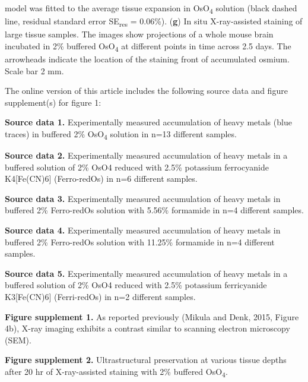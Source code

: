 \documentclass{article}
\begin{document}
model was fitted to the average tissue expansion in OsO\textsubscript{4} solution (black dashed line, residual standard error SE\textsubscript{res} = 0.06\%). (\textbf{g}) In situ X-ray-assisted staining of large tissue samples. The images show projections of a whole mouse brain incubated in 2\% buffered OsO\textsubscript{4} at different points in time across 2.5 days. The arrowheads indicate the location of the staining front of accumulated osmium. Scale bar 2 mm.

\noindent The online version of this article includes the following source data and figure supplement(s) for figure 1:

\noindent\textbf{Source data 1.} Experimentally measured accumulation of heavy metals (blue traces) in buffered 2\% OsO\textsubscript{4} solution in n=13 different samples.

\noindent\textbf{Source data 2.} Experimentally measured accumulation of heavy metals in a buffered solution of 2\% OsO4 reduced with 2.5\% potassium ferrocyanide K4[Fe(CN)6] (Ferro-redOs) in n=6 different samples.

\noindent\textbf{Source data 3.} Experimentally measured accumulation of heavy metals in buffered 2\% Ferro-redOs solution with 5.56\% formamide in n=4 different samples.

\noindent\textbf{Source data 4.} Experimentally measured accumulation of heavy metals in buffered 2\% Ferro-redOs solution with 11.25\% formamide in n=4 different samples.

\noindent\textbf{Source data 5.} Experimentally measured accumulation of heavy metals in a buffered solution of 2\% OsO4 reduced with 2.5\% potassium ferricyanide K3[Fe(CN)6] (Ferri-redOs) in n=2 different samples.

\noindent\textbf{Figure supplement 1.} As reported previously (Mikula and Denk, 2015, Figure 4b), X-ray imaging exhibits a contrast similar to scanning electron microscopy (SEM).

\noindent\textbf{Figure supplement 2.} Ultrastructural preservation at various tissue depths after 20 hr of X-ray-assisted staining with 2\% buffered OsO\textsubscript{4}.
\end{document}
